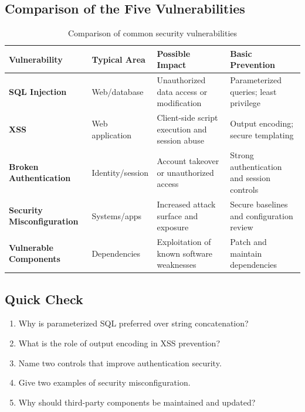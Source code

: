 \documentclass[11pt,a4paper]{article}
\begin{document}
\subsection{Comparison of the Five Vulnerabilities}
\begin{table}[H]\centering
\small
\begin{tabularx}{\textwidth}{>{\bfseries}p{3.0cm}p{2.0cm}X X}
\toprule
Vulnerability & Typical Area & Possible Impact & Basic Prevention\\
\midrule
SQL Injection & Web/database & Unauthorized data access or modification & Parameterized queries; least privilege\\
XSS & Web application & Client-side script execution and session abuse & Output encoding; secure templating\\
Broken Authentication & Identity/session & Account takeover or unauthorized access & Strong authentication and session controls\\
Security Misconfiguration & Systems/apps & Increased attack surface and exposure & Secure baselines and configuration review\\
Vulnerable Components & Dependencies & Exploitation of known software weaknesses & Patch and maintain dependencies\\
\bottomrule
\end{tabularx}
\caption{Comparison of common security vulnerabilities}
\end{table}

\subsection{Quick Check}
\begin{enumerate}
\item Why is parameterized SQL preferred over string concatenation?
\item What is the role of output encoding in XSS prevention?
\item Name two controls that improve authentication security.
\item Give two examples of security misconfiguration.
\item Why should third-party components be maintained and updated?
\end{enumerate}
\end{document}

